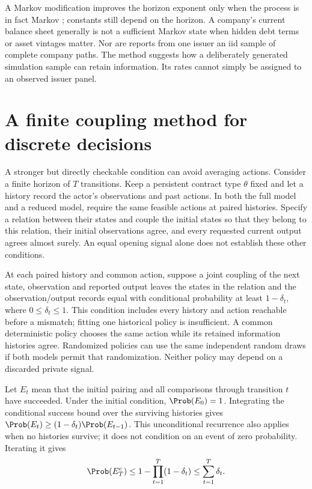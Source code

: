 A Markov modification improves the horizon exponent only when the process
is in fact Markov \cite[Theorem~6.1]{litcloseestimation}; constants still depend on
the horizon. A company's current balance sheet generally is not a sufficient
Markov state when hidden debt terms or asset vintages matter. Nor are reports
from one issuer an iid sample of complete company paths. The method suggests
how a deliberately generated simulation sample can retain information. Its
rates cannot simply be assigned to an observed issuer panel.

\section{A finite coupling method for discrete decisions}
A stronger but directly checkable condition can avoid averaging actions.
Consider a finite horizon of $T$ transitions. Keep a persistent contract type
$\theta$ fixed and let a history record the actor's observations and past
actions. In both the full model and a reduced model, require the same feasible
actions at paired histories. Specify a relation between their states and couple
the initial states so that they belong to this relation, their initial
observations agree, and every requested current output agrees almost surely.
An equal opening signal alone does not establish these other conditions.

At each paired history and common action, suppose a joint coupling of the next
state, observation and reported output leaves the states in the relation and
the observation/output records equal with conditional probability at least
$1-\delta_t$, where $0\leq\delta_t\leq1$. This condition includes every history
and action reachable before a mismatch; fitting one historical policy is
insufficient. A common deterministic policy chooses the same action while its
retained information histories agree. Randomized policies can use the same
independent random draws if both models permit that randomization. Neither
policy may depend on a discarded private signal.

Let $E_t$ mean that the initial pairing and all comparisons through transition
$t$ have succeeded. Under the initial condition, $\Prob(E_0)=1$. Integrating
the conditional success bound over the surviving histories gives
$\Prob(E_t)\geq(1-\delta_t)\Prob(E_{t-1})$. This unconditional recurrence also
applies when no histories survive; it does not condition on an event of zero
probability. Iterating it gives
\begin{equation}
\Prob(E_T^c)\le1-\prod_{t=1}^T(1-\delta_t)
\le\sum_{t=1}^T\delta_t.
\label{sim:lit-finite-coupling}
\end{equation}

